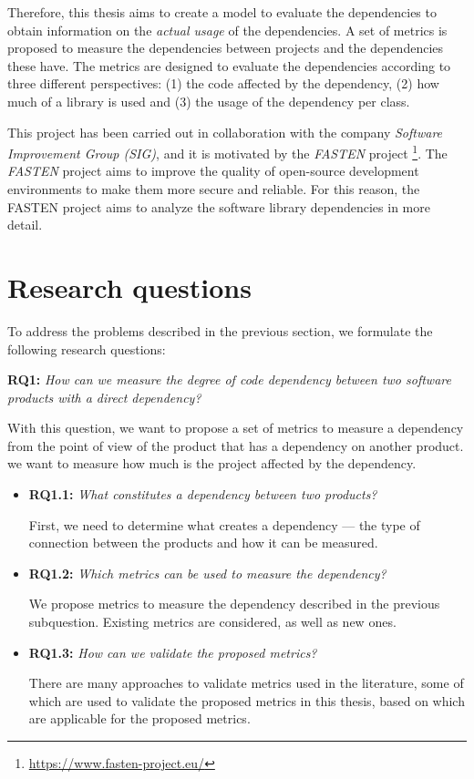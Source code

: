 \blankl
Therefore, this thesis aims to create a model to evaluate the dependencies to obtain information on the \textit{actual usage} of the dependencies. A set of metrics is proposed to measure the dependencies between projects and the dependencies these have. The metrics are designed to evaluate the dependencies according to three different perspectives: (1) the code affected by the dependency, (2) how much of a library is used and (3) the usage of the dependency per class.

This project has been carried out in collaboration with the company \textit{Software Improvement Group (SIG)}, and it is motivated by the \textit{FASTEN} project \footnote{\url{https://www.fasten-project.eu/}}. The \textit{FASTEN} project aims to improve the quality of open-source development environments to make them more secure and reliable. For this reason, the FASTEN project aims to analyze the software library dependencies in more detail.

\section{Research questions}
To address the problems described in the previous section, we formulate the following research questions:

\blankl
\textbf{RQ1:} \textit{How can we measure the degree of code dependency between two software products with a direct dependency?}

\blankls
With this question, we want to propose a set of metrics to measure a dependency from the point of view of the product that has a dependency on another product. we want to measure how much is the project affected by the dependency.

\begin{itemize}
  \item \textbf{RQ1.1:} \textit{What constitutes a dependency between two products?}

  First, we need to determine what creates a dependency — the type of connection between the products and how it can be measured.

  \item \textbf{RQ1.2:} \textit{Which metrics can be used to measure the dependency?}

  We propose metrics to measure the dependency described in the previous subquestion. Existing metrics are considered, as well as new ones.

  \item \textbf{RQ1.3:} \textit{How can we validate the proposed metrics?}

  There are many approaches to validate metrics used in the literature, some of which are used to validate the proposed metrics in this thesis, based on which are applicable for the proposed metrics.
\end{itemize}

